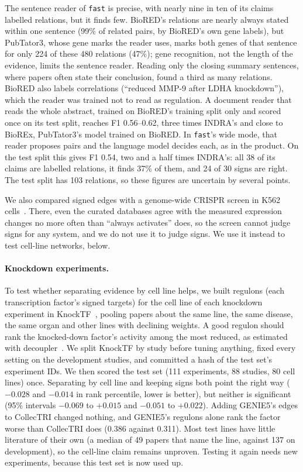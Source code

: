\documentclass[11pt,a4paper]{article}
\newcommand{\gen}{GENIE5}
\newcommand{\code}[1]{\texttt{#1}}
\begin{document}
The sentence reader of \code{fast} is precise, with nearly nine in ten of its claims labelled
relations, but it finds few. BioRED's relations are nearly always stated within one sentence (99\%
of related pairs, by BioRED's own gene labels), but PubTator3, whose gene marks the reader uses,
marks both genes of that sentence for only 224 of these 480 relations (47\%); gene recognition,
not the length of the evidence, limits the sentence reader. Reading only the closing summary sentences, where papers
often state their conclusion, found a third as many relations. BioRED also
labels correlations (``reduced MMP-9 after LDHA knockdown''), which the reader was trained not to
read as regulation. A document reader that reads the whole abstract, trained on BioRED's training
split only and scored once on its test split, reaches F1 0.56--0.62, three times INDRA's and close
to BioREx, PubTator3's model trained on BioRED. In \code{fast}'s wide mode, that reader proposes
pairs and the language model decides each, as in the product. On the test split this gives F1 0.54,
two and a half times INDRA's: all 38 of its claims are labelled relations, it finds 37\% of them,
and 24 of 30 signs are right. The test split has 103 relations, so these figures are uncertain
by several points.

We also compared signed edges with a genome-wide CRISPR screen in K562 cells~\cite{perturbseq}.
There, even the curated databases agree with the measured expression changes no more often than
``always activates'' does, so the screen cannot judge signs for any system, and we do not use it
to judge signs. We use it instead to test cell-line networks, below.

\paragraph{Knockdown experiments.} To test whether separating evidence by cell line helps, we
built regulons (each transcription factor's signed targets) for the cell line of each knockdown
experiment in KnockTF~\cite{knocktf}, pooling papers about the same line, the same disease, the
same organ and other lines with declining weights. A good regulon should rank the knocked-down
factor's activity among the most reduced, as estimated with decoupler~\cite{decoupler}. We split
KnockTF by study before tuning anything, fixed every setting on the development studies, and
committed a hash of the test set's experiment IDs. We then scored the test set (111 experiments,
88 studies, 80 cell lines) once. Separating by cell line and keeping signs both point the right way
($-0.028$ and $-0.014$ in rank percentile, lower is better), but neither is significant (95\%
intervals $-0.069$ to $+0.015$ and $-0.051$ to $+0.022$). Adding \gen{}'s edges to CollecTRI
changed nothing, and \gen{}'s regulons alone rank the factor worse than CollecTRI does (0.386
against 0.311). Most test lines have little literature of their own (a median of 49 papers that
name the line, against 137 on development), so the cell-line claim remains unproven. Testing it
again needs new experiments, because this test set is now used up.
\end{document}
